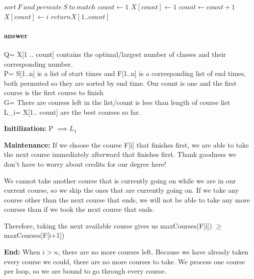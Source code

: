 \documentclass{article}
\begin{document}
\begin{algorithmic}[1]
    \State$ sort\ F\ and\ permute\ S\ to\ match$
    \State$ count \gets 1$
    \State$ X [count] \gets 1$
            \State$ count \gets count + 1$
            \State$ X [count] \gets i$
        \EndIf{}
    \EndFor{}
    \State$ return X [1 .. count]$
\end{algorithmic}

\paragraph{answer}

Q= X[1 .. count] contains the optimal/largest number of classes and their corresponding number.\\
P= S[1..n] is a list of start times and F[1..n] is a corresponding list of end times, both permuted
so they are sorted by end time. Our count is one and the first course is the first course to finish\\
G= There are courses left in the list/count is less than length of course list\\
L_{i}= X[1.. count] are the best courses so far.

{\bf Initilization:} P $\implies L_{1}$

{\bf Maintenance: } If we choose the course F[i] that finishes first, we are able to take the next course immediately afterward that finishes first. Thank goodness we don't have to worry about credits for our degree here!

We cannot take another course that is currently going on while we are in our current course, so we skip the ones that are currently going on. If we take any course other than the next course that ends, we will not be able to take any more courses than if we took the next course that ends.

Therefore, taking the next available course gives us maxCourses(F[i]) $\geq$ maxCourses(F[i+1])

{\bf End: } When $i > n$, there are no more courses left. Because we have already taken every course we could, there are no more courses to take. We process one course per loop, so we are bound to go through every course.
\end{document}
